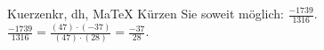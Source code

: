 \begin{MAufgabe}{Kuerzen}{kr, dh, MaTeX}
K\"urzen Sie soweit m\"oglich: $\frac{-1739}{1316}$.\\ 
\ifLsg\MLoesung
\quad $\frac{-1739}{1316}=\frac{(47)\cdot(-37)}{(47)\cdot(28)}=\frac{-37}{28}$.\else\relax\fi
 \end{MAufgabe}